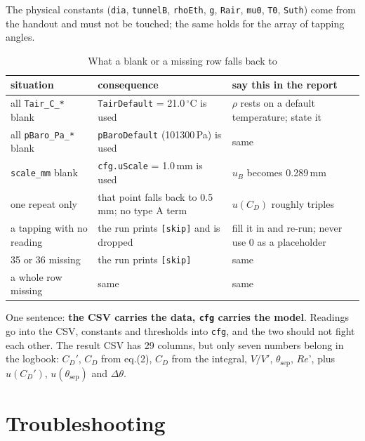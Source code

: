 \documentclass[11pt,a4paper]{article}
\newcommand{\CD}{\ensuremath{C_D}}
\newcommand{\ReD}{\ensuremath{\mathit{Re}}}
\begin{document}
The physical constants (\texttt{dia}, \texttt{tunnelB}, \texttt{rhoEth}, \texttt{g}, \texttt{Rair},
\texttt{mu0}, \texttt{T0}, \texttt{Suth}) come from the handout and must not be touched; the same
holds for the array of tapping angles.

\begin{table}[H]
\centering
\caption{What a blank or a missing row falls back to}
\small
\begin{tabularx}{\textwidth}{@{}p{4.4cm} p{4.2cm} X@{}}
\toprule
situation & consequence & say this in the report \\
\midrule
all \texttt{Tair\_C\_*} blank & \texttt{TairDefault} = 21.0\,$^\circ$C is used & $\rho$ rests on a default temperature; state it \\
all \texttt{pBaro\_Pa\_*} blank & \texttt{pBaroDefault} (101300\,Pa) is used & same \\
\texttt{scale\_mm} blank & \texttt{cfg.uScale} = 1.0\,mm is used & $u_B$ becomes 0.289\,mm \\
one repeat only & that point falls back to 0.5\,mm; no type A term & $u(\CD)$ roughly triples \\
a tapping with no reading & the run prints \texttt{[skip]} and is dropped & fill it in and re-run; never use 0 as a placeholder \\
35 or 36 missing & the run prints \texttt{[skip]} & same \\
a whole row missing & same & same \\
\bottomrule
\end{tabularx}
\end{table}

One sentence: \textbf{the CSV carries the data, \texttt{cfg} carries the model}. Readings go into the
CSV, constants and thresholds into \texttt{cfg}, and the two should not fight each other. The result
CSV has 29 columns, but only seven numbers belong in the logbook: $\CD'$, $\CD$ from eq.(2),
$\CD$ from the integral, $V/V'$, $\theta_{\text{sep}}$, \ReD{}', plus $u(\CD')$,
$u(\theta_{\text{sep}})$ and $\Delta\theta$.

\section{Troubleshooting}
\end{document}
